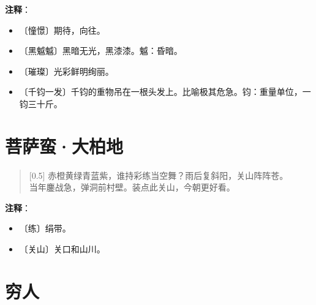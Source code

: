 \documentclass[12pt,UTF-8,openany]{ctexbook}
\begin{document}
\newpage

\textbf{注释}：

\vspace{-1em}

\begin{itemize}
    \setlength\itemsep{-0.2em}
    \item 〔憧憬〕期待，向往。
    \item 〔黑魆魆〕黑暗无光，黑漆漆。魆：昏暗。
    \item 〔璀璨〕光彩鲜明绚丽。
    \item 〔千钧一发〕千钧的重物吊在一根头发上。比喻极其危急。钧：重量单位，一钧三十斤。
\end{itemize}

\chapter{菩萨蛮·大柏地}

\begin{large}
    
    \begin{verse}[0.5\linewidth]
        赤橙黄绿青蓝紫，谁持彩练当空舞？雨后复斜阳，关山阵阵苍。 \\
        当年鏖战急，弹洞前村壁。装点此关山，今朝更好看。
    \end{verse}
    
\end{large}


\newpage

\textbf{注释}：

\vspace{-1em}

\begin{itemize}
    \setlength\itemsep{-0.2em}
    \item 〔练〕绢带。
    \item 〔关山〕关口和山川。
\end{itemize}

\chapter{穷人}
\end{document}
